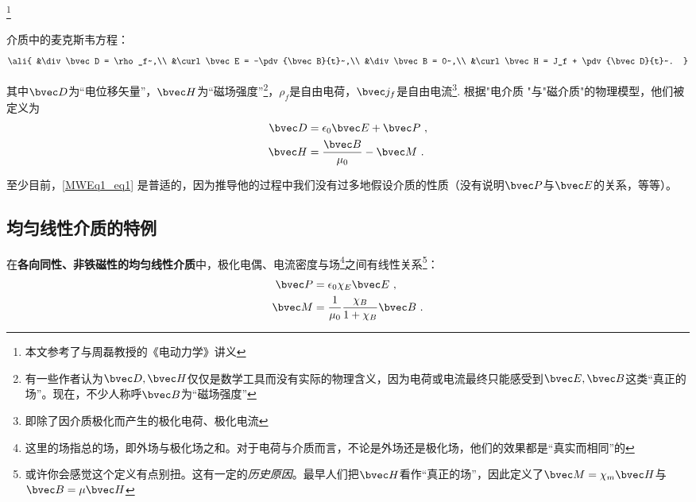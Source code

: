 
\footnote{本文参考了\cite{GriffE}与周磊教授的《电动力学》讲义}
\begin{issues}
\issueDraft
\end{issues}

介质中的麦克斯韦方程：
\begin{equation}\label{MWEq1_eq1}\ali{
&\div\bvec D = \rho_f~,\\
&\curl\bvec E = -\pdv{\bvec B}{t}~,\\
&\div\bvec B = 0~,\\
&\curl\bvec H = J_f + \pdv{\bvec D}{t}~.
}\end{equation}

其中$\bvec D$为“电位移矢量”，$\bvec H$为“磁场强度”\footnote{有一些作者认为$\bvec D, \bvec H$仅仅是数学工具而没有实际的物理含义，因为电荷或电流最终只能感受到$\bvec E, \bvec B$这类“真正的场”。现在，不少人称呼$\bvec B$为“磁场强度”}，$\rho_f$是自由电荷，$\bvec j_f$是自由电流\footnote{即除了因介质极化而产生的极化电荷、极化电流}. 根据"电介质  "与"磁介质"的物理模型，他们被定义为
\begin{align}
\bvec D &= \epsilon_0 \bvec E + \bvec P~,\\
\bvec H &= \frac{\bvec B}{\mu_0} - \bvec M~.\\
\end{align}

至少目前，\autoref{MWEq1_eq1} 是普适的，因为推导他的过程中我们没有过多地假设介质的性质（没有说明$\bvec P$与$\bvec E$的关系，等等）。

\subsection{均匀线性介质的特例}
在\textbf{各向同性、非铁磁性的均匀线性介质}中，极化电偶、电流密度与场\footnote{这里的场指总的场，即外场与极化场之和。对于电荷与介质而言，不论是外场还是极化场，他们的效果都是“真实而相同”的}之间有线性关系\footnote{或许你会感觉这个定义有点别扭。这有一定的\textsl{历史原因}。最早人们把$\bvec H$看作“真正的场”，因此定义了$\bvec M = \chi_m \bvec H$与$\bvec B = \mu \bvec H$}：
\begin{align}
\bvec P &= \epsilon_0 \chi_E \bvec E~,\\
\bvec M &= \frac{1}{\mu_0} \frac{\chi_B}{1+\chi_B}\bvec B~.\\
\end{align}

